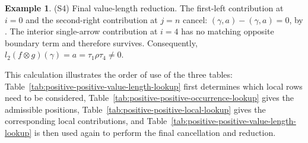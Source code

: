 \documentclass[11pt,a4paper,reqno]{amsart}
\newcommand{\para}[2]{(#1,#2)}
\theoremstyle{plain}
\theoremstyle{definition}
\newtheorem{example}[example]{Example}
\numberwithin{equation}{section}
\begin{document}
\begin{example}
		\medskip
		\noindent
		\textup{(S4) Final value-length reduction.}
		The first-left contribution at $i=0$ and the second-right contribution
		at $j=n$ cancel:
		$\para{\gamma}{a}-\para{\gamma}{a}=0$, by
		.  The interior single-arrow
		contribution at $i=4$ has no matching opposite boundary term and
		therefore survives.  Consequently,
		$l_2(f\otimes g)(\gamma)=a=\tau_1\rho\tau_4\neq0$.
		
		This calculation illustrates the order of use of the three
		tables: Table~\ref{tab:positive-positive-value-length-lookup} first determines which
		local rows need to be considered,
		Table~\ref{tab:positive-positive-occurrence-lookup} gives the admissible positions,
		Table~\ref{tab:positive-positive-local-lookup} gives the corresponding local
		contributions, and
		Table~\ref{tab:positive-positive-value-length-lookup} is then used again to perform the
		final cancellation and reduction.
	\end{example}
	\clearpage
\end{document}
